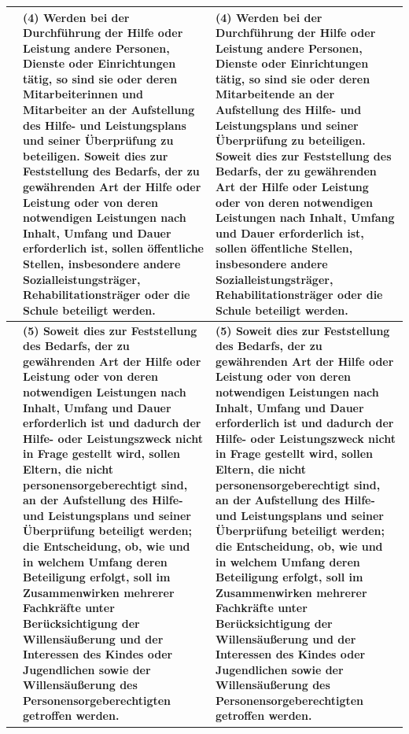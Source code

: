 \documentclass[10pt,a4paper,landscape]{article}
\begin{document}
\begin{longtable}{|L{8.6cm}|L{8.6cm}|L{8.6cm}|}
 & \textbf{(4) Werden bei der Durchführung der Hilfe oder Leistung andere Personen, Dienste oder Einrichtungen tätig, so sind sie oder deren Mitarbeiterinnen und Mitarbeiter an der Aufstellung des Hilfe- und Leistungsplans und seiner Überprüfung zu beteiligen. Soweit dies zur Feststellung des Bedarfs, der zu gewährenden Art der Hilfe oder Leistung oder von deren notwendigen Leistungen nach Inhalt, Umfang und Dauer erforderlich ist, sollen öffentliche Stellen, insbesondere andere Sozialleistungsträger, Rehabilitationsträger oder die Schule beteiligt werden. } & \textbf{(4) Werden bei der Durchführung der Hilfe oder Leistung andere Personen, Dienste oder Einrichtungen tätig, so sind sie oder deren Mitarbeitende an der Aufstellung des Hilfe- und Leistungsplans und seiner Überprüfung zu beteiligen. Soweit dies zur Feststellung des Bedarfs, der zu gewährenden Art der Hilfe oder Leistung oder von deren notwendigen Leistungen nach Inhalt, Umfang und Dauer erforderlich ist, sollen öffentliche Stellen, insbesondere andere Sozialleistungsträger, Rehabilitationsträger oder die Schule beteiligt werden. } \\
\hline
 & \textbf{(5) Soweit dies zur Feststellung des Bedarfs, der zu gewährenden Art der Hilfe oder Leistung oder von deren notwendigen Leistungen nach Inhalt, Umfang und Dauer erforderlich ist und dadurch der Hilfe- oder Leistungszweck nicht in Frage gestellt wird, sollen Eltern, die nicht personensorgeberechtigt sind, an der Aufstellung des Hilfe- und Leistungsplans und seiner Überprüfung beteiligt werden; die Entscheidung, ob, wie und in welchem Umfang deren Beteiligung erfolgt, soll im Zusammenwirken mehrerer Fachkräfte unter Berücksichtigung der Willensäußerung und der Interessen des Kindes oder Jugendlichen sowie der Willensäußerung des Personensorgeberechtigten getroffen werden. } & \textbf{(5) Soweit dies zur Feststellung des Bedarfs, der zu gewährenden Art der Hilfe oder Leistung oder von deren notwendigen Leistungen nach Inhalt, Umfang und Dauer erforderlich ist und dadurch der Hilfe- oder Leistungszweck nicht in Frage gestellt wird, sollen Eltern, die nicht personensorgeberechtigt sind, an der }\textbf{Aufstellung des Hilfe- und Leistungsplans und seiner Überprüfung beteiligt werden; die Entscheidung, ob, wie und in welchem Umfang deren Beteiligung erfolgt, soll im Zusammenwirken mehrerer Fachkräfte unter Berücksichtigung der Willensäußerung und der Interessen des Kindes oder Jugendlichen sowie der Willensäußerung des Personensorgeberechtigten getroffen werden. } \\
\hline

\end{longtable}
\end{document}
